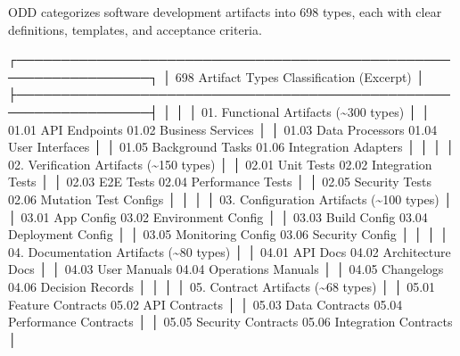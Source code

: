 \documentclass[
]{article}
\newenvironment{Shaded}{}{}
\newcommand{\NormalTok}[1]{#1}
\begin{document}
ODD categorizes software development artifacts into 698 types, each with
clear definitions, templates, and acceptance criteria.

\begin{Shaded}
\begin{Highlighting}[]
\NormalTok{┌─────────────────────────────────────────────────────────────────┐}
\NormalTok{│            698 Artifact Types Classification (Excerpt)           │}
\NormalTok{├─────────────────────────────────────────────────────────────────┤}
\NormalTok{│                                                                  │}
\NormalTok{│  01. Functional Artifacts (\textasciitilde{}300 types)                          │}
\NormalTok{│      01.01 API Endpoints    01.02 Business Services             │}
\NormalTok{│      01.03 Data Processors  01.04 User Interfaces               │}
\NormalTok{│      01.05 Background Tasks 01.06 Integration Adapters          │}
\NormalTok{│                                                                  │}
\NormalTok{│  02. Verification Artifacts (\textasciitilde{}150 types)                        │}
\NormalTok{│      02.01 Unit Tests       02.02 Integration Tests             │}
\NormalTok{│      02.03 E2E Tests        02.04 Performance Tests             │}
\NormalTok{│      02.05 Security Tests   02.06 Mutation Test Configs         │}
\NormalTok{│                                                                  │}
\NormalTok{│  03. Configuration Artifacts (\textasciitilde{}100 types)                       │}
\NormalTok{│      03.01 App Config       03.02 Environment Config            │}
\NormalTok{│      03.03 Build Config     03.04 Deployment Config             │}
\NormalTok{│      03.05 Monitoring Config 03.06 Security Config              │}
\NormalTok{│                                                                  │}
\NormalTok{│  04. Documentation Artifacts (\textasciitilde{}80 types)                        │}
\NormalTok{│      04.01 API Docs         04.02 Architecture Docs             │}
\NormalTok{│      04.03 User Manuals     04.04 Operations Manuals            │}
\NormalTok{│      04.05 Changelogs       04.06 Decision Records              │}
\NormalTok{│                                                                  │}
\NormalTok{│  05. Contract Artifacts (\textasciitilde{}68 types)                             │}
\NormalTok{│      05.01 Feature Contracts 05.02 API Contracts                │}
\NormalTok{│      05.03 Data Contracts   05.04 Performance Contracts         │}
\NormalTok{│      05.05 Security Contracts 05.06 Integration Contracts       │}

\end{Highlighting}
\end{Shaded}
\end{document}

